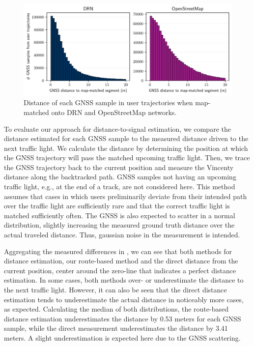 \begin{figure}[t]
\centering 
\includegraphics[width=\linewidth]{images/routing-gnss-mapmatching-distribution.pdf}
\caption{Distance of each GNSS sample in user trajectories when map-matched onto DRN and OpenStreetMap networks.}
\label{fig:routing-gnss-mapmatching-distribution}
\end{figure}

To evaluate our approach for distance-to-signal estimation, we compare the distance estimated for each GNSS sample to the measured distance driven to the next traffic light. We calculate the distance by determining the position at which the GNSS trajectory will pass the matched upcoming traffic light. Then, we trace the GNSS trajectory back to the current position and measure the Vincenty distance along the backtracked path. GNSS samples not having an upcoming traffic light, e.g., at the end of a track, are not considered here. This method assumes that cases in which users preliminarily deviate from their intended path over the traffic light are sufficiently rare and that the correct traffic light is matched sufficiently often. The GNSS is also expected to scatter in a normal distribution, slightly increasing the measured ground truth distance over the actual traveled distance. Thus, gaussian noise in the measurement is intended.

Aggregating the measured differences in , we can see that both methods for distance estimation, our route-based method and the direct distance from the current position, center around the zero-line that indicates a perfect distance estimation. In some cases, both methods over- or underestimate the distance to the next traffic light. However, it can also be seen that the direct distance estimation tends to underestimate the actual distance in noticeably more cases, as expected. Calculating the median of both distributions, the route-based distance estimation underestimates the distance by 0.53 meters for each GNSS sample, while the direct measurement underestimates the distance by 3.41 meters. A slight underestimation is expected here due to the GNSS scattering.

